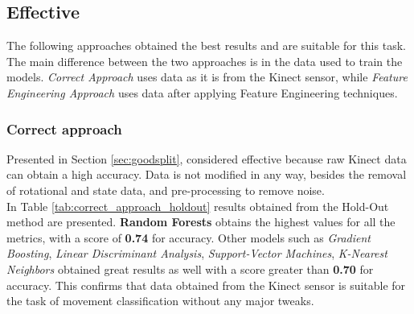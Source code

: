         \subsection{Effective}

                The following approaches obtained the best results and are suitable for this task. The main difference between the two approaches is in the data used to train the models. \textit{Correct Approach} uses data as it is from the Kinect sensor, while \textit{Feature Engineering Approach} uses data after applying Feature Engineering techniques.
                
            \subsubsection{Correct approach}

                Presented in Section \ref{sec:goodsplit}, considered effective because raw Kinect data can obtain a high accuracy. Data is not modified in any way, besides the removal of rotational and state data, and pre-processing to remove noise.\\
                 
                In Table \ref{tab:correct_approach_holdout} results obtained from the Hold-Out method are presented. \textbf{Random Forests} obtains the highest values for all the metrics, with a score of \textbf{0.74} for accuracy. Other models such as \textit{Gradient Boosting}, \textit{Linear Discriminant Analysis}, \textit{Support-Vector Machines}, \textit{K-Nearest Neighbors} obtained great results as well with a score greater than \textbf{0.70} for accuracy. This confirms that data obtained from the Kinect sensor is suitable for the task of movement classification without any major tweaks.\\
                
                \newpage

